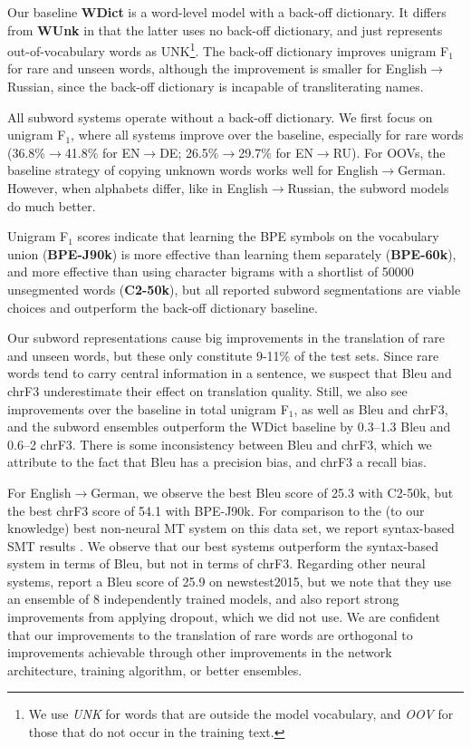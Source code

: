 \documentclass[11pt]{article}
\begin{document}
Our baseline \textbf{WDict} is a word-level model with a back-off dictionary.
It differs from \textbf{WUnk} in that the latter uses no back-off dictionary, and just represents out-of-vocabulary words as UNK\footnote{We use \emph{UNK} for words that are outside the model vocabulary, and \emph{OOV} for those that do not occur in the training text.}.
The back-off dictionary improves unigram F$_1$ for rare and unseen words, although the improvement is smaller for English$\to$Russian, since the back-off dictionary is incapable of transliterating names.

All subword systems operate without a back-off dictionary.
We first focus on unigram F$_1$, where all systems improve over the baseline,
especially for rare words (36.8\%$\rightarrow$41.8\% for EN$\to$DE; 26.5\%$\rightarrow$29.7\% for EN$\to$RU).
For OOVs, the baseline strategy of copying unknown words works well for English$\to$German.
However, when alphabets differ, like in English$\to$Russian, the subword models do much better.

Unigram F$_1$ scores indicate that learning the BPE symbols on the vocabulary union (\textbf{BPE-J90k})
is more effective than learning them separately (\textbf{BPE-60k}), and more effective than using character bigrams with a shortlist of \num{50000} unsegmented words (\textbf{C2-50k}),
but all reported subword segmentations are viable choices and outperform the back-off dictionary baseline.

Our subword representations cause big improvements in the translation of rare and unseen words, but these only constitute 9-11\% of the test sets.
Since rare words tend to carry central information in a sentence, we suspect that {\sc Bleu} and {\sc chrF3} underestimate their effect on translation quality.
Still, we also see improvements over the baseline in total unigram F$_1$, as well as {\sc Bleu} and {\sc chrF3}, and the subword ensembles outperform the WDict baseline by 0.3--1.3 {\sc Bleu} and 0.6--2 {\sc chrF3}.
There is some inconsistency between {\sc Bleu} and {\sc chrF3}, which we attribute to the fact that {\sc Bleu} has a precision bias, and {\sc chrF3} a recall bias.

For English$\to$German, we observe the best {\sc Bleu} score of 25.3 with C2-50k, but the best {\sc chrF3} score of 54.1 with BPE-J90k.
For comparison to the (to our knowledge) best non-neural MT system on this data set, we report syntax-based SMT results \cite{sennrichhaddow15}.
We observe that our best systems outperform the syntax-based system in terms of {\sc Bleu}, but not in terms of {\sc chrF3}.
Regarding other neural systems,  report a {\sc Bleu} score of 25.9 on newstest2015, but we note that they use an ensemble of 8 independently trained models, and also report strong improvements from applying dropout, which we did not use.
We are confident that our improvements to the translation of rare words are orthogonal to improvements achievable through other improvements in the network architecture, training algorithm, or better ensembles.
\end{document}
